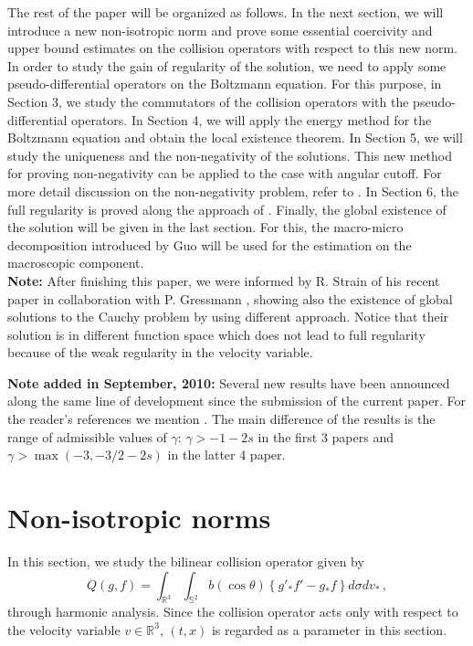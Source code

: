 \documentclass{amsart}[12pt, article]
\begin{document}
The rest of the paper will be organized as follows. In the next section,
we will introduce a new non-isotropic norm and prove some essential
coercivity and upper bound estimates on the collision operators
with respect to this new norm.
In order to study the gain of regularity of the solution, we need to apply
some  pseudo-differential operators
on the Boltzmann equation. For this purpose, in Section 3,
 we  study
the commutators of the collision operators with the
pseudo-differential operators.
 In Section 4, we will apply
the energy method for the Boltzmann equation and obtain
the local existence theorem. In Section 5, we will study the
uniqueness and the non-negativity of the solutions. 
This new method for proving non-negativity 
can be applied to the case with angular cutoff. For more detail
discussion on the non-negativity problem,  refer to \cite{amuxy4-4}.
In Section 6,
the full regularity is proved along the approach of
\cite{amuxy-nonlinear-3}. Finally,  the global existence of the solution
will be given in the last section. For this, the macro-micro decomposition introduced by Guo \cite{guo}
will be used for the estimation on the macroscopic component.\\

{\bf Note:} After finishing this paper,  we were informed by R. Strain of his recent paper in collaboration with P. Gressmann
\cite{gr-st}, showing also the existence of global solutions to the Cauchy problem by using different approach. Notice that their solution is in different
function space which does not lead to full regularity because of the weak regularity in
the velocity variable.

{\bf Note added in September, 2010:} Several new results have been announced along the same
line of development since the submission of the current paper. For the reader's references
we mention \cite{gr-st2,gr-st3,gr-st4, amuxy4-1,  amuxy4-3, amuxy4-4}.
The main difference of the results is the range of admissible values of $\gamma$:
$\gamma>-1-2s$ in the first 3 papers and $\gamma>\max(-3, -3/2-2s)$ in the latter 4 paper.

\section{Non-isotropic norms}\label{section2}
\smallskip

In this section, we study the bilinear collision operator given by
\[
Q(g, f)=\int_{{{{\mathbb R}}}^3}\int_{\mathbb S^{2}}b(\cos\theta)
 \left\{g'_* f'-g_*f\right\}d\sigma dv_*\,,
\]
through harmonic analysis.
Since the collision operator acts only with respect to the velocity variable
$v\in{{{\mathbb R}}}^3$, $(t, x)$ is regarded as a parameter in this section.
\end{document}
